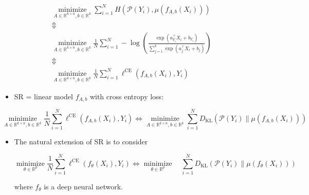 \documentclass{report}
\begin{document}
\begin{concept}
    $$
    \begin{gathered}
    \underset{A \in \mathbb{R}^{k \times n}, b \in \mathbb{R}^{k}}{\operatorname{minimize}} \sum_{i=1}^{N} H\left(\mathcal{P}\left(Y_{i}\right), \mu\left(f_{A, b}\left(X_{i}\right)\right)\right) \\
    \mathbb{\Updownarrow} \\
    \underset{A \in \mathbb{R}^{k \times n}, b \in \mathbb{R}^{k}}{\operatorname{minimize}} \frac{1}{N} \sum_{i=1}^{N}-\log \left(\frac{\exp \left(a_{Y_{i}}^{\top} X_{i}+b_{Y_{i}}\right)}{\sum_{j=1}^{k} \exp \left(a_{j}^{\top} X_{i}+b_{j}\right)}\right) \\
    \mathbb{\Updownarrow} \\
    \underset{A \in \mathbb{R}^{k \times n}, b \in \mathbb{R}^{k}}{\operatorname{minimize}} \frac{1}{N} \sum_{i=1}^{N} \ell^{\mathrm{CE}}\left(f_{A, b}\left(X_{i}\right), Y_{i}\right)
    \end{gathered}
    $$

    \begin{itemize}
        \item SR = linear model $f_{A, b}$ with cross entropy loss:
    \end{itemize}

    $$
    \underset{A \in \mathbb{R}^{k \times n}, b \in \mathbb{R}^{k}}{\operatorname{minimize}} \frac{1}{N} \sum_{i=1}^{N} \ell^{\mathrm{CE}}\left(f_{A, b}\left(X_{i}\right), Y_{i}\right) \Longleftrightarrow \underset{A \in \mathbb{R}^{k \times n}, b \in \mathbb{R}^{k}}{\operatorname{minimize}} \sum_{i=1}^{N} D_{\mathrm{KL}}\left(\mathcal{P}\left(Y_{i}\right) \| \mu\left(f_{A, b}\left(X_{i}\right)\right)\right)
    $$

    \begin{itemize}
        \item
        The natural extension of SR is to consider

        $$
        \underset{\theta \in \mathbb{R}^{p}}{\operatorname{minimize}} \frac{1}{N} \sum_{i=1}^{N} \ell^{\mathrm{CE}}\left(f_{\theta}\left(X_{i}\right), Y_{i}\right) \Leftrightarrow \underset{\theta \in \mathbb{R}^{p}}{\operatorname{minimize}} \quad \sum_{i=1}^{N} D_{\mathrm{KL}}\left(\mathcal{P}\left(Y_{i}\right) \| \mu\left(f_{\theta}\left(X_{i}\right)\right)\right)
        $$

        where $f_{\theta}$ is a deep neural network.
    \end{itemize}
\end{concept}
\end{document}
